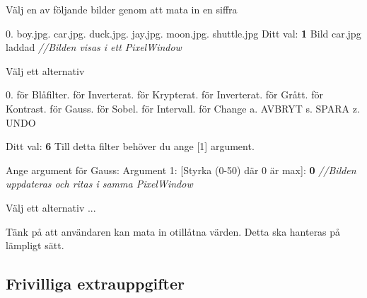 {\setlength{\parindent}{0cm}

 Välj en av följande bilder genom att mata in en siffra\newline

0. boy.jpg. car.jpg. duck.jpg. jay.jpg. moon.jpg. shuttle.jpg\newline
Ditt val: \textbf{1}\newline
Bild car.jpg laddad\newline
\textit{//Bilden visas i ett PixelWindow}\newline

Välj ett alternativ\newline

0. för Blåfilter. för Inverterat. för Krypterat. för Inverterat. för Grått. för Kontrast. för Gauss. för Sobel. för Intervall. för Change\newline
a. AVBRYT\newline
s. SPARA\newline
z. UNDO\newline

Ditt val: \textbf{6}\newline
Till detta filter behöver du ange [1] argument.\newline

Ange argument för Gauss: \newline
Argument 1: [Styrka (0-50) där 0 är max]: \textbf{0}\newline
\textit{//Bilden uppdateras och ritas i samma PixelWindow}\newline

Välj ett alternativ\newline
...
}

Tänk på att användaren kan mata in otillåtna värden. Detta ska hanteras på lämpligt sätt.

\subsection{Frivilliga extrauppgifter}

